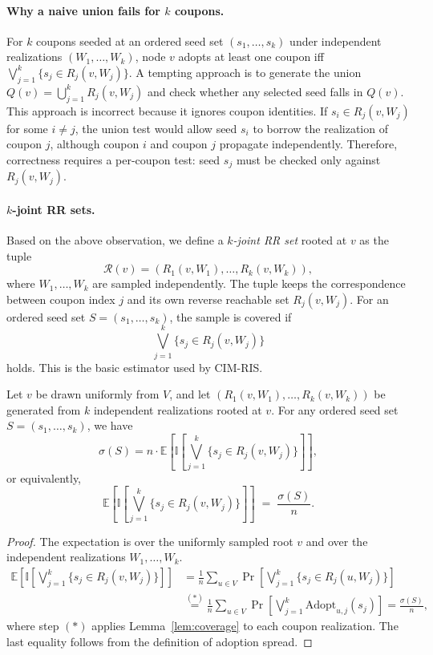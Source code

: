 \documentclass[sigconf]{acmart}
\newcommand{\CIMRIS}{\textsc{CIM-RIS}}
\newcommand{\E}{\mathbb{E}}
\newcommand{\I}{\mathbb{I}}
\begin{document}
\paragraph{Why a naive union fails for $k$ coupons.}
For $k$ coupons seeded at an ordered seed set $(s_1, \ldots, s_k)$ under independent realizations
$(W_1, \ldots, W_k)$, node $v$ adopts at least one coupon iff
$\bigvee_{j=1}^k \{s_j \in R_j(v, W_j)\}$.
A tempting approach is to generate the union
$Q(v)=\bigcup_{j=1}^k R_j(v,W_j)$ and check whether any selected seed
falls in $Q(v)$.
This approach is incorrect because it ignores coupon identities.
If $s_i\in R_j(v,W_j)$ for some $i\neq j$, the union test would allow
seed $s_i$ to borrow the realization of coupon $j$, although coupon
$i$ and coupon $j$ propagate independently.
Therefore, correctness requires a per-coupon test: seed $s_j$ must be
checked only against $R_j(v,W_j)$.

\paragraph{$k$-joint RR sets.}
Based on the above observation, we define a \emph{$k$-joint RR set}
rooted at $v$ as the tuple
\[
  \mathcal{R}(v)=(R_1(v,W_1),\ldots,R_k(v,W_k)),
\]
where $W_1,\ldots,W_k$ are sampled independently.
The tuple keeps the correspondence between coupon index $j$ and its
own reverse reachable set $R_j(v,W_j)$.
For an ordered seed set $S=(s_1,\ldots,s_k)$, the sample is covered if
\[
  \bigvee_{j=1}^k \{s_j\in R_j(v,W_j)\}
\]
holds.
This is the basic estimator used by \CIMRIS{}.

\begin{lemma}[Unbiasedness]
\label{lem:unbiased}
Let $v$ be drawn uniformly from $V$, and let
$(R_1(v, W_1), \ldots, R_k(v, W_k))$ be generated from $k$ independent
realizations rooted at $v$.
For any ordered seed set $S=(s_1,\ldots,s_k)$, we have
\[
  \sigma(S)
  = n\cdot
  \E\!\left[
    \I\!\left[\bigvee_{j=1}^{k} \{s_j \in R_j(v,W_j)\}\right]
  \right],
\]
or equivalently,
\[
  \E\!\left[
    \I\!\left[\bigvee_{j=1}^{k} \{s_j \in R_j(v,W_j)\}\right]
  \right]
  \;=\; \frac{\sigma(S)}{n}.
\]
\end{lemma}

\begin{proof}
The expectation is over the uniformly sampled root $v$ and over the
independent realizations $W_1,\ldots,W_k$.
\begin{align*}
  \E\!\left[
    \I\!\left[\bigvee_{j=1}^k \{s_j \in R_j(v,W_j)\}\right]
  \right]
  &= \frac{1}{n}\sum_{u\in V}
     \Pr\!\left[\bigvee_{j=1}^k \{s_j \in R_j(u,W_j)\}\right] \\
  &\stackrel{(*)}{=}
     \frac{1}{n}\sum_{u\in V}
     \Pr\!\left[\bigvee_{j=1}^k \mathrm{Adopt}_{u,j}(s_j)\right]
  = \frac{\sigma(S)}{n},
\end{align*}
where step $(*)$ applies Lemma~\ref{lem:coverage} to each coupon realization.
The last equality follows from the definition of adoption spread.
\end{proof}
\end{document}
